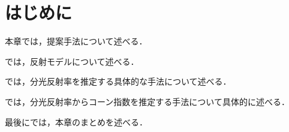 \documentclass[../main]{subfiles}
\begin{document}
\section{はじめに}
\label{sec:pmethod_introduction}

本章では，提案手法について述べる．

では，反射モデルについて述べる．

では，分光反射率を推定する具体的な手法について述べる．

では，分光反射率からコーン指数を推定する手法について具体的に述べる．

最後にでは，本章のまとめを述べる．
\end{document}
